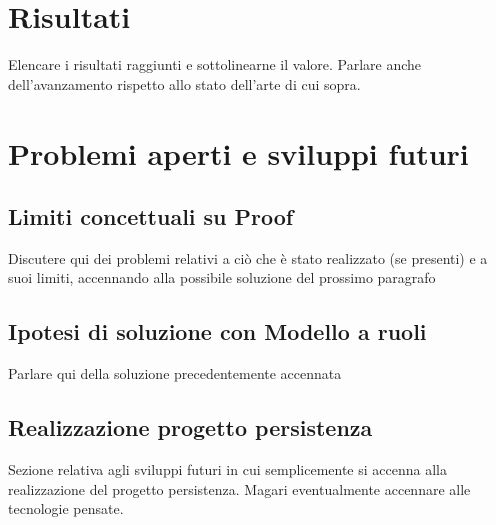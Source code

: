 \section{Risultati}

	Elencare i risultati raggiunti e sottolinearne il valore. Parlare anche dell'avanzamento rispetto allo stato dell'arte
	di cui sopra.

\section{Problemi aperti e sviluppi futuri}

	\subsection{Limiti concettuali su Proof}
	
		Discutere qui dei problemi relativi a ciò che è stato realizzato (se presenti) e a suoi limiti, accennando alla possibile
		soluzione del prossimo paragrafo
	
	\subsection{Ipotesi di soluzione con Modello a ruoli}
	
		Parlare qui della soluzione precedentemente accennata
	
	\subsection{Realizzazione progetto persistenza}
		
		Sezione relativa agli sviluppi futuri in cui semplicemente si accenna alla realizzazione del progetto persistenza.
		Magari eventualmente accennare alle tecnologie pensate.